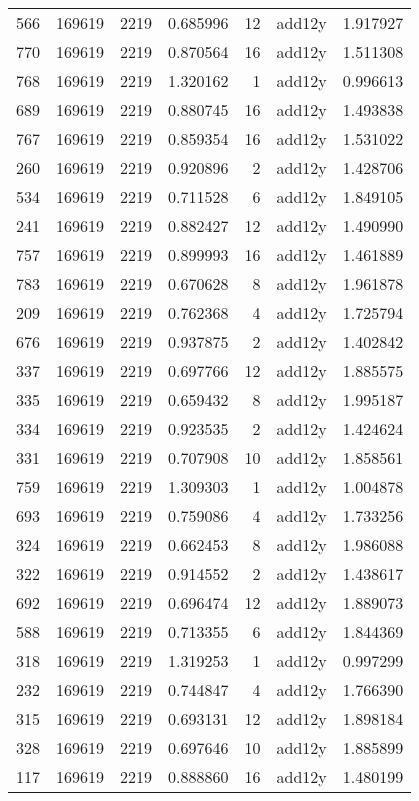 \begin{tabular}{lrrrrlr}
566 & 169619 & 2219 & 0.685996 & 12 & add12y & 1.917927 \\
770 & 169619 & 2219 & 0.870564 & 16 & add12y & 1.511308 \\
768 & 169619 & 2219 & 1.320162 & 1 & add12y & 0.996613 \\
689 & 169619 & 2219 & 0.880745 & 16 & add12y & 1.493838 \\
767 & 169619 & 2219 & 0.859354 & 16 & add12y & 1.531022 \\
260 & 169619 & 2219 & 0.920896 & 2 & add12y & 1.428706 \\
534 & 169619 & 2219 & 0.711528 & 6 & add12y & 1.849105 \\
241 & 169619 & 2219 & 0.882427 & 12 & add12y & 1.490990 \\
757 & 169619 & 2219 & 0.899993 & 16 & add12y & 1.461889 \\
783 & 169619 & 2219 & 0.670628 & 8 & add12y & 1.961878 \\
209 & 169619 & 2219 & 0.762368 & 4 & add12y & 1.725794 \\
676 & 169619 & 2219 & 0.937875 & 2 & add12y & 1.402842 \\
337 & 169619 & 2219 & 0.697766 & 12 & add12y & 1.885575 \\
335 & 169619 & 2219 & 0.659432 & 8 & add12y & 1.995187 \\
334 & 169619 & 2219 & 0.923535 & 2 & add12y & 1.424624 \\
331 & 169619 & 2219 & 0.707908 & 10 & add12y & 1.858561 \\
759 & 169619 & 2219 & 1.309303 & 1 & add12y & 1.004878 \\
693 & 169619 & 2219 & 0.759086 & 4 & add12y & 1.733256 \\
324 & 169619 & 2219 & 0.662453 & 8 & add12y & 1.986088 \\
322 & 169619 & 2219 & 0.914552 & 2 & add12y & 1.438617 \\
692 & 169619 & 2219 & 0.696474 & 12 & add12y & 1.889073 \\
588 & 169619 & 2219 & 0.713355 & 6 & add12y & 1.844369 \\
318 & 169619 & 2219 & 1.319253 & 1 & add12y & 0.997299 \\
232 & 169619 & 2219 & 0.744847 & 4 & add12y & 1.766390 \\
315 & 169619 & 2219 & 0.693131 & 12 & add12y & 1.898184 \\
328 & 169619 & 2219 & 0.697646 & 10 & add12y & 1.885899 \\
117 & 169619 & 2219 & 0.888860 & 16 & add12y & 1.480199 \\

\end{tabular}
